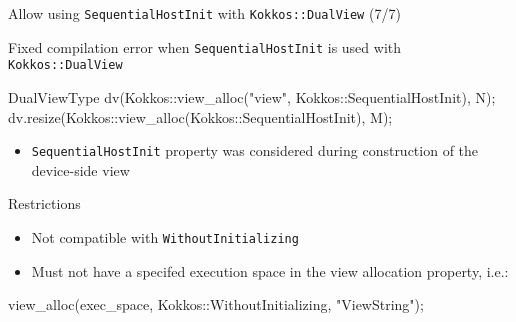 \begin{frame}[fragile]{Allow using \texttt{SequentialHostInit} with \texttt{Kokkos::DualView} (7/7)}

Fixed compilation error when \texttt{SequentialHostInit} is used with \texttt{Kokkos::DualView}

\vspace{5pt}

\begin{code}
  DualViewType dv(Kokkos::view_alloc("view", Kokkos::SequentialHostInit), N);
  dv.resize(Kokkos::view_alloc(Kokkos::SequentialHostInit), M);
\end{code}

\vspace{5pt}

\begin{itemize}
  \item \texttt{SequentialHostInit} property was considered during construction of the device-side view
\end{itemize}

\vspace{5pt}

Restrictions
\begin{itemize}
  \item Not compatible with \texttt{WithoutInitializing}
  \item Must not have a specifed execution space in the view allocation property, i.e.:
\end{itemize}
\begin{code}
    view_alloc(exec_space, Kokkos::WithoutInitializing, "ViewString");
\end{code}

\end{frame}

